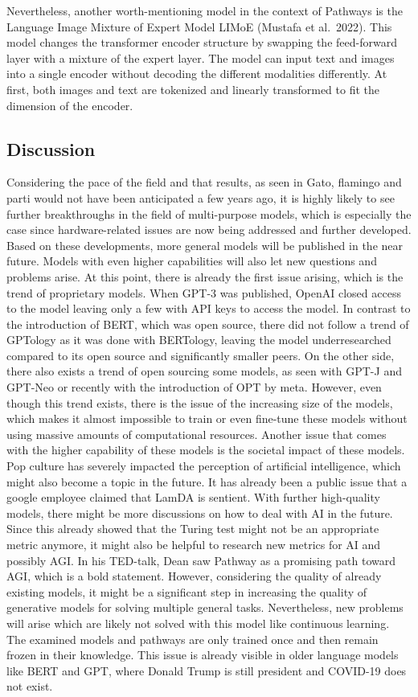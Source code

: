 \documentclass[
]{krantz}
\begin{document}
Nevertheless, another worth-mentioning model in the context of Pathways is the Language Image Mixture of Expert Model LIMoE (Mustafa et al.~2022). This model changes the transformer encoder structure by swapping the feed-forward layer with a mixture of the expert layer.
The model can input text and images into a single encoder without decoding the different modalities differently. At first, both images and text are tokenized and linearly transformed to fit the dimension of the encoder.

\hypertarget{discussion-1}{%
\subsection{Discussion}\label{discussion-1}}

Considering the pace of the field and that results, as seen in Gato, flamingo and parti would not have been anticipated a few years ago, it is highly likely to see further breakthroughs in the field of multi-purpose models, which is especially the case since hardware-related issues are now being addressed and further developed. Based on these developments, more general models will be published in the near future. Models with even higher capabilities will also let new questions and problems arise. At this point, there is already the first issue arising, which is the trend of proprietary models. When GPT-3 was published, OpenAI closed access to the model leaving only a few with API keys to access the model.
In contrast to the introduction of BERT, which was open source, there did not follow a trend of GPTology as it was done with BERTology, leaving the model underresearched compared to its open source and significantly smaller peers. On the other side, there also exists a trend of open sourcing some models, as seen with GPT-J and GPT-Neo or recently with the introduction of OPT by meta. However, even though this trend exists, there is the issue of the increasing size of the models, which makes it almost impossible to train or even fine-tune these models without using massive amounts of computational resources.
Another issue that comes with the higher capability of these models is the societal impact of these models. Pop culture has severely impacted the perception of artificial intelligence, which might also become a topic in the future. It has already been a public issue that a google employee claimed that LamDA is sentient. With further high-quality models, there might be more discussions on how to deal with AI in the future. Since this already showed that the Turing test might not be an appropriate metric anymore, it might also be helpful to research new metrics for AI and possibly AGI.
In his TED-talk, Dean saw Pathway as a promising path toward AGI, which is a bold statement. However, considering the quality of already existing models, it might be a significant step in increasing the quality of generative models for solving multiple general tasks. Nevertheless, new problems will arise which are likely not solved with this model like continuous learning. The examined models and pathways are only trained once and then remain frozen in their knowledge. This issue is already visible in older language models like BERT and GPT, where Donald Trump is still president and COVID-19 does not exist.
\end{document}
